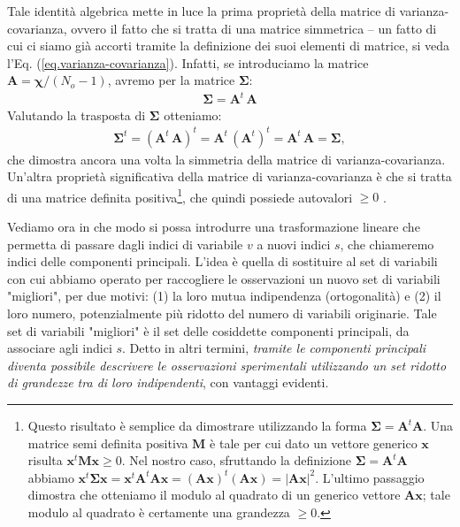 \documentclass[11pt]{amsart}
\begin{document}
%
Tale identità algebrica mette in luce la prima proprietà della matrice di varianza-covarianza, ovvero il fatto che si tratta di una matrice simmetrica  -- un fatto di cui ci siamo già accorti tramite la definizione dei suoi elementi di matrice, si veda l'Eq. (\ref{eq.varianza-covarianza}). 
%
Infatti, se introduciamo la matrice $\bm A = \bm \chi / (N_o-1)$, avremo per la matrice $\bm \Sigma$:
%
\begin{eqnarray}
\label{eq.definizione-covarianza}
\bm \Sigma = \bm A^t \, \bm A
\end{eqnarray}
%
Valutando la trasposta di $\bm \Sigma$ otteniamo:
%
\begin{eqnarray}
\bm \Sigma^t = (\bm A^t \, \bm A)^t = \bm A^t \, (\bm A^t)^t = \bm A^t \, \bm A = \bm \Sigma,
\end{eqnarray}
%
che dimostra ancora una volta la simmetria della matrice di varianza-covarianza.
%
Un'altra proprietà significativa della matrice di varianza-covarianza è che si tratta di una matrice definita positiva\footnote{Questo risultato è semplice da dimostrare utilizzando la forma $\bm \Sigma = \bm A^t \bm A$. Una matrice semi definita positiva $\bm M$ è tale per cui dato un vettore generico $\bm x$ risulta $\bm x^t \bm M \bm x \ge 0$. Nel nostro caso, sfruttando la definizione $\bm \Sigma = \bm A^t \bm A$ abbiamo $\bm x^t \bm \Sigma \bm x = \bm x^t \bm A^t \bm A \bm x = (\bm A \bm x)^t (\bm A \bm x) = \left| \bm A \bm x \right|^2$. L'ultimo passaggio dimostra che otteniamo il modulo al quadrato di un generico vettore $\bm A \bm x$; tale modulo al quadrato è certamente una grandezza $\ge 0$.}, che quindi possiede autovalori $\ge 0$ .
%









Vediamo ora in che modo si possa introdurre una trasformazione lineare che permetta di passare dagli indici di variabile $v$ a nuovi indici $s$, che chiameremo indici delle componenti principali. L'idea è quella di sostituire al set di variabili con cui abbiamo operato per raccogliere le osservazioni un nuovo set di variabili "migliori", per due motivi: (1) la loro mutua indipendenza (ortogonalità) e (2) il loro numero, potenzialmente più ridotto del numero di variabili originarie. Tale set di variabili "migliori" è il set delle cosiddette componenti principali, da associare agli indici $s$.
Detto in altri termini, {\em tramite le componenti principali diventa possibile descrivere le osservazioni sperimentali utilizzando un set ridotto di grandezze tra di loro indipendenti}, con vantaggi evidenti.
\end{document}
